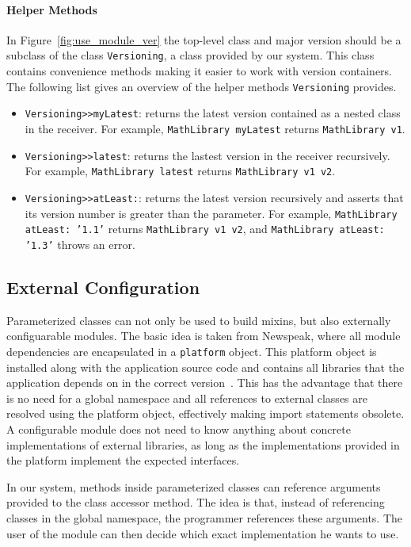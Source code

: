 \paragraph{Helper Methods}
In Figure~\ref{fig:use_module_ver} the top-level class and major version should be a subclass of the class \texttt{Versioning}, a class provided by our system. This class contains convenience methods making it easier to work with version containers. The following list gives an overview of the helper methods \texttt{Versioning} provides.

\begin{itemize}
	\item \texttt{Versioning>>myLatest}: returns the latest version contained as a nested class in the receiver. For example, \texttt{MathLibrary myLatest} returns \texttt{MathLibrary v1}.
	\item \texttt{Versioning>>latest}: returns the lastest version in the receiver recursively. For example, \texttt{MathLibrary latest} returns \texttt{MathLibrary v1 v2}.
	\item \texttt{Versioning>>atLeast:}: returns the latest version recursively and asserts that its version number is greater than the parameter. For example, \texttt{MathLibrary atLeast: '1.1'} returns \texttt{MathLibrary v1 v2}, and \texttt{MathLibrary atLeast: '1.3'} throws an error.
\end{itemize}

\subsection{External Configuration}
Parameterized classes can not only be used to build mixins, but also externally configuarable modules. The basic idea is taken from Newspeak, where all module dependencies are encapsulated in a \texttt{platform} object. This platform object is installed along with the application source code and contains all libraries that the application depends on in the correct version~\cite{bracha2008newspeak}. This has the advantage that there is no need for a global namespace and all references to external classes are resolved using the platform object, effectively making import statements obsolete. A configurable module does not need to know anything about concrete implementations of external libraries, as long as the implementations provided in the platform implement the expected interfaces.

In our system, methods inside parameterized classes can reference arguments provided to the class accessor method. The idea is that, instead of referencing classes in the global namespace, the programmer references these arguments. The user of the module can then decide which exact implementation he wants to use.

